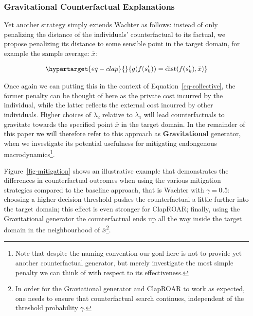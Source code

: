 \documentclass[
  conference]{IEEEtran}
\begin{document}
\hypertarget{gravitational-counterfactual-explanations}{%
\subsubsection{Gravitational Counterfactual
Explanations}\label{gravitational-counterfactual-explanations}}

Yet another strategy simply extends Wachter as follows: instead of only
penalizing the distance of the individuals' counterfactual to its
factual, we propose penalizing its distance to some sensible point in
the target domain, for example the sample average: \(\bar{x}\):

\begin{equation}\protect\hypertarget{eq-clap}{}{
\begin{aligned}
g(f(s_k^\prime)) = \text{dist}(f(s_k^\prime),\bar{x})
\end{aligned}
}\label{eq-clap}\end{equation}

Once again we can putting this in the context of
Equation~\ref{eq-collective}, the former penalty can be thought of here
as the private cost incurred by the individual, while the latter
reflects the external cost incurred by other individuals. Higher choices
of \(\lambda_2\) relative to \(\lambda_1\) will lead counterfactuals to
gravitate towards the specified point \(\bar{x}\) in the target domain.
In the remainder of this paper we will therefore refer to this approach
as \textbf{Gravitational} generator, when we investigate its potential
usefulness for mitigating endongenous macrodynamics\footnote{Note that
  despite the naming convention our goal here is not to provide yet
  another counterfactual generator, but merely investigate the most
  simple penalty we can think of with respect to its effectiveness.}.

Figure~\ref{fig-mitigation} shows an illustrative example that
demonstrates the differences in counterfactual outcomes when using the
various mitigation strategies compared to the baseline approach, that is
Wachter with \(\gamma=0.5\): choosing a higher decision threshold pushes
the counterfactual a little further into the target domain; this effect
is even stronger for ClapROAR; finally, using the Gravitational
generator the counterfactual ends up all the way inside the target
domain in the neighbourhood of \(\bar{x}\)\footnote{In order for the
  Graviational generator and ClapROAR to work as expected, one needs to
  ensure that counterfactual search continues, independent of the
  threshold probability \(\gamma\).}.
\end{document}
